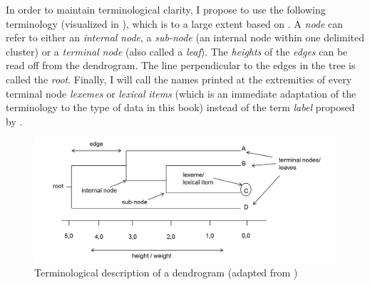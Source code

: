 In order to maintain terminological clarity, I propose to use the following terminology (visualized in ), which is to a large extent based on \citet[89]{everitt_cluster_2011}. A \textit{node} can refer to either an \textit{internal} \textit{node}, a \textit{sub-node} (an internal node within one delimited cluster) or a \textit{terminal} \textit{node} (also called a \textit{leaf}). The \textit{heights} of the \textit{edges} can be read off from the dendrogram. The line perpendicular to the edges in the tree is called the \textit{root}. Finally, I will call the names printed at the extremities of every terminal node \textit{lexemes} or \textit{lexical} \textit{items} (which is an immediate adaptation of the terminology to the type of data in this book) instead of the term \textit{label} proposed by \citet{everitt_cluster_2011}. 

\begin{figure}
\includegraphics[width=\textwidth]{figures/Vandevoorde2-img27.png}
\caption{\label{fig:3:27}Terminological description of a dendrogram (adapted from \citealt[89]{everitt_cluster_2011})}
\end{figure}

